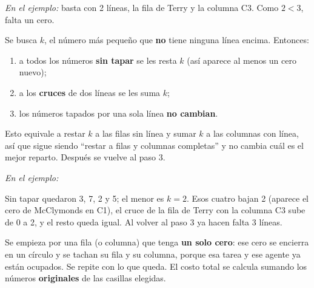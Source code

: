 \documentclass[11pt,a4paper]{article}
\newcommand{\marco}[3]{%
  \foreach \i in {2,...,#2} \foreach \j in {2,...,#3}
    \draw[gray!60, very thin] (#1-\i-\j.north west) rectangle (#1-\i-\j.south east);
  \draw[semithick] (#1-2-2.north west) rectangle (#1-#2-#3.south east);}
\newcommand{\tfila}[3]{\draw[tapa] (#1-#2-2.west) -- (#1-#2-#3.east);}
\newcommand{\tcol}[3]{\draw[tapa] (#1-2-#2.north) -- (#1-#3-#2.south);}
\newcommand{\flecha}[3]{\draw[-{Stealth[length=2.4mm]}, thick] (#1.east) -- node[above, font=\scriptsize, align=center] {#3} (#1.east -| #2.west);}
\begin{document}
\textit{En el ejemplo:} basta con 2 líneas, la fila de Terry y la columna C3. Como $2 < 3$, falta un cero.

Se busca $k$, el número más pequeño que \textbf{no} tiene ninguna línea encima. Entonces:
\begin{enumerate}[itemsep=2pt]
  \item a todos los números \textbf{sin tapar} se les resta $k$ (así aparece al menos un cero nuevo);
  \item a los \textbf{cruces} de dos líneas se les suma $k$;
  \item los números tapados por una sola línea \textbf{no cambian}.
\end{enumerate}
Esto equivale a restar $k$ a las filas sin línea y sumar $k$ a las columnas con línea, así que sigue siendo
``restar a filas y columnas completas'' y no cambia cuál es el mejor reparto. Después se vuelve al paso 3.

\textit{En el ejemplo:}

\begin{center}
\end{center}
Sin tapar quedaron 3, 7, 2 y 5; el menor es $k = 2$. Esos cuatro bajan 2 (aparece el cero de McClymonds en C1),
el cruce de la fila de Terry con la columna C3 sube de 0 a 2, y el resto queda igual. Al volver al paso 3 ya hacen
falta 3 líneas.

Se empieza por una fila (o columna) que tenga \textbf{un solo cero}: ese cero se encierra en un círculo y se tachan
su fila y su columna, porque esa tarea y ese agente ya están ocupados. Se repite con lo que queda. El costo total se
calcula sumando los números \textbf{originales} de las casillas elegidas.
\end{document}
